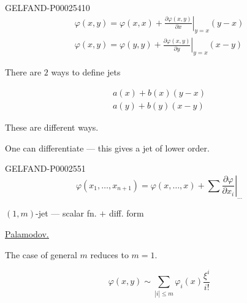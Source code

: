 \begin{GelfandAdjacentEvidence}{GELFAND-P000254}{10}
\begin{gather*}
\varphi (x, y)=\varphi (x, x)+\left.\frac{\partial\varphi (x, y)}{\partial x}\right|_{y=x}(y-x)
\\
\varphi (x, y)=\varphi (y, y)+\left.\frac{\partial\varphi (x, y)}{\partial y}\right|_{y=x}(x-y)
\end{gather*}

\end{GelfandAdjacentEvidence}


There are $2$ ways to define jets

\begin{gather*}
a (x)+b (x)(y-x)
\\
a (y)+b (y)(x-y)
\end{gather*}

These are different ways.







One can differentiate — this gives a jet of lower order.





\begin{GelfandAdjacentEvidence}{GELFAND-P000255}{1}
\begin{equation*}
\varphi (x_1,\ldots, x_{n+1})=\varphi (x,\ldots, x)+\sum\left.\frac{\partial\varphi}{\partial x_i}\right|_{\ldots}
\end{equation*}

\end{GelfandAdjacentEvidence}


$(1, m)$-jet — scalar fn. $+$ diff. form





\underline{\underline{Palamodov.}}

The case of general $m$ reduces to $m=1$.





\begin{equation*}
\varphi (x, y)\sim\sum_{|i|\le m}\varphi_i (x)\frac{\xi^i}{i!}
\end{equation*}





